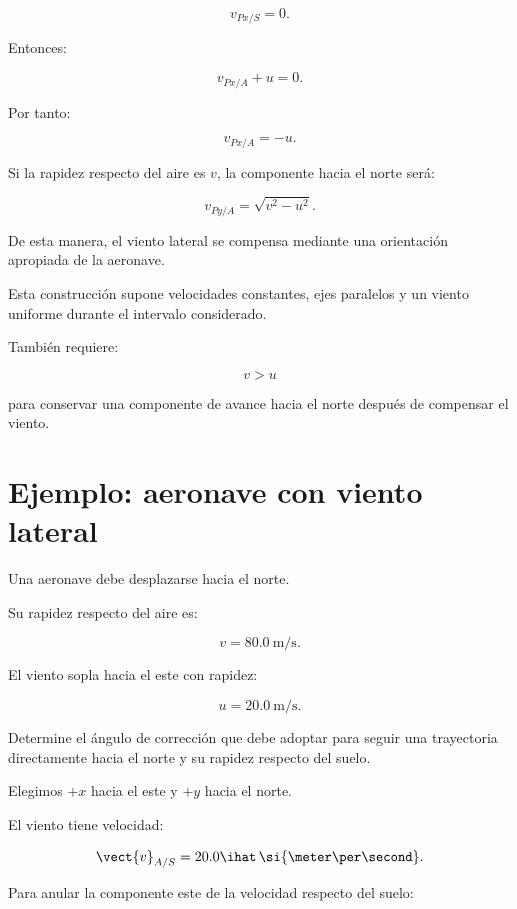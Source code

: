 \[
v_{Px/S}=0.
\]

Entonces:

\[
v_{Px/A}+u=0.
\]

Por tanto:

\[
\boxed{
v_{Px/A}=-u
}.
\]

Si la rapidez respecto del aire es \(v\),
la componente hacia el norte será:

\[
\boxed{
v_{Py/A}=\sqrt{v^2-u^2}
}.
\]

De esta manera, el viento lateral
se compensa mediante una orientación
apropiada de la aeronave.

\begin{condicion}

Esta construcción supone velocidades constantes,
ejes paralelos y un viento uniforme durante
el intervalo considerado.

También requiere:

\[
v>u
\]

para conservar una componente de avance
hacia el norte después de compensar el viento.

\end{condicion}


\section{Ejemplo: aeronave con viento lateral}

\begin{ejemplo}

Una aeronave debe desplazarse hacia el norte.

Su rapidez respecto del aire es:

\[
v=\SI{80.0}{\meter\per\second}.
\]

El viento sopla hacia el este con rapidez:

\[
u=\SI{20.0}{\meter\per\second}.
\]

Determine el ángulo de corrección que debe adoptar
para seguir una trayectoria directamente hacia el norte
y su rapidez respecto del suelo.

\end{ejemplo}

Elegimos \(+x\) hacia el este y \(+y\)
hacia el norte.

El viento tiene velocidad:

\[
\vect{v}_{A/S}
=
20.0\ihat\,
\si{\meter\per\second}.
\]

Para anular la componente este de la
velocidad respecto del suelo:

